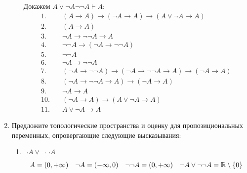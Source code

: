 \begin{enumerate}
\begin{enumerate}
                    Докажем \(A \vee \neg A \neg\neg A \vdash A\):
                    \begin{align*}
                        1.\quad  & (A \to A) \to (\neg A \to A) \to (A\lor \neg A \to A) \tag{акс. 8}                          \\
                        2.\quad  & (A \to A) \tag{было ранее}                                                                  \\
                        3.\quad  & \neg A \to \neg \neg A \to A \tag{акс. 10}                                                  \\
                        4.\quad  & \neg \neg A \to (\neg A \to \neg \neg A) \tag{акс. 1}                                       \\
                        5.\quad  & \neg \neg A \tag{\(\in \Gamma\)}                                                            \\
                        6.\quad  & \neg A \to \neg \neg A \tag{M.P. 4,5}                                                       \\
                        7.\quad  & (\neg A \to \neg \neg A) \to (\neg A \to \neg \neg A \to A) \to (\neg A \to A) \tag{акс. 2} \\
                        8.\quad  & (\neg A \to \neg \neg A \to A) \to (\neg A \to A) \tag{M.P. 6,7}                            \\
                        9.\quad  & \neg A \to A \tag{M.P. 3,8}                                                                 \\
                        10.\quad & (\neg A \to A) \to (A\lor \neg A \to A) \tag{M.P. 1,2}                                      \\
                        11.\quad & A\lor \neg A \to A \tag{M.P. 9, 10}
                    \end{align*}
          \end{enumerate}

    \item Предложите топологические пространства и оценку для пропозициональных переменных,
          опровергающие следующие высказывания:

          \begin{enumerate}
              \item $\neg A \vee \neg\neg A $

                    \[A = (0, +\infty) \quad \neg A = ( -\infty, 0) \quad \neg \neg A = (0, +\infty) \quad \neg A \lor \neg \neg A = \mathbb{R}\setminus \{0\}  \]


\end{enumerate}
\end{enumerate}
